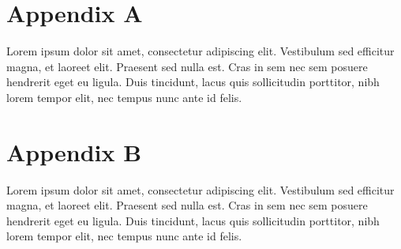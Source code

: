 \glsresetall
\section*{Appendix A}
\label{app:appendix_a}

Lorem ipsum dolor sit amet, consectetur adipiscing elit. Vestibulum sed efficitur magna, et laoreet elit. Praesent sed nulla est. Cras in sem nec sem posuere hendrerit eget eu ligula. Duis tincidunt, lacus quis sollicitudin porttitor, nibh lorem tempor elit, nec tempus nunc ante id felis.


\blankpage


\section*{Appendix B}
\label{app:appendix_b}

Lorem ipsum dolor sit amet, consectetur adipiscing elit. Vestibulum sed efficitur magna, et laoreet elit. Praesent sed nulla est. Cras in sem nec sem posuere hendrerit eget eu ligula. Duis tincidunt, lacus quis sollicitudin porttitor, nibh lorem tempor elit, nec tempus nunc ante id felis.
